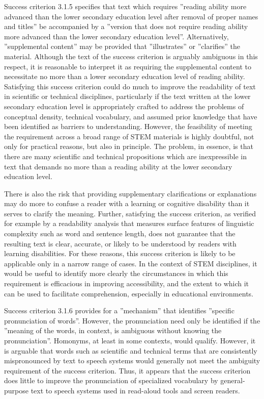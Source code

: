 \documentclass{sig-alternate} %
\begin{document}
\begin{large}
Success criterion 3.1.5 specifies that text which requires ”reading ability more advanced than the lower secondary education level after removal of proper names and titles” be accompanied by a ”version that does not require reading ability more advanced than the lower secondary education level”. Alternatively, ”supplemental content” may be provided that ”illustrates” or ”clarifies” the material. Although the text of the success criterion is arguably ambiguous in this respect, it is reasonable to interpret it as requiring the supplemental content to necessitate no more than a lower secondary education level of reading ability. Satisfying this success criterion could do much to improve the readability of text in scientific or technical disciplines, particularly if the text written at the lower secondary education level is appropriately crafted to address the problems of conceptual density, technical vocabulary, and assumed prior knowledge that have been identified as barriers to understanding. However, the feasibility of meeting the requirement across a broad range of STEM materials is highly doubtful, not only for practical reasons, but also in principle. The problem, in essence, is that there are many scientific and technical propositions which are inexpressible in text that demands no more than a reading ability at the lower secondary education level.

There is also the risk that providing supplementary clarifications or explanations may do more to confuse a reader with a learning or cognitive disability than it serves to clarify the meaning. Further, satisfying the success criterion, as verified for example by a readability analysis that measures surface features of linguistic complexity such as word and sentence length, does not guarantee that the resulting text is clear, accurate, or likely to be understood by readers with learning disabilities. For these reasons, this success criterion is likely to be applicable only in a narrow range of cases. In the context of STEM disciplines, it would be useful to identify more clearly the circumstances in which this requirement is efficacious in improving accessibility, and the extent to which it can be used to facilitate comprehension, especially in educational environments.

Success criterion 3.1.6 provides for a ”mechanism” that identifies ”specific pronunciation of words”. However, the pronunciation need only be identified if the ”meaning of the words, in context, is ambiguous without knowing the pronunciation”. Homonyms, at least in some contexts, would qualify. However, it is arguable that words such as scientific and technical terms that are consistently mispronounced by text to speech systems would generally not meet the ambiguity requirement of the success criterion. Thus, it appears that the success criterion does little to improve the pronunciation of specialized vocabulary by general-purpose text to speech systems used in read-aloud tools and screen readers.


\end{large}
\end{document}
